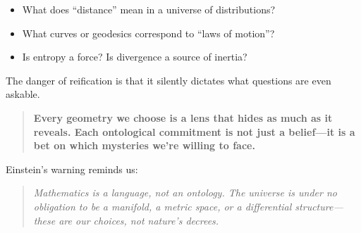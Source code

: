 \begin{tcolorbox}[colback=yellow!5!white, colframe=yellow!50!black, title={Historical Sidebar: Einstein’s Warning Against Reification}, breakable]
    \medskip
    
    \begin{itemize}
        \item What does “distance” mean in a universe of distributions?
        \item What curves or geodesics correspond to “laws of motion”?
        \item Is entropy a force? Is divergence a source of inertia?
    \end{itemize}

    \medskip
    
    The danger of reification is that it silently dictates what questions are even askable.
    
    \medskip
    
    \begin{quote}
    \textbf{Every geometry we choose is a lens that hides as much as it reveals.  Each ontological commitment is not just a belief—it is a bet on which mysteries we’re willing to face.}
    \end{quote}
    
    Einstein’s warning reminds us:
    
    \begin{quote}
    \textit{Mathematics is a language, not an ontology.  The universe is under no obligation to be a manifold, a metric space, or a differential structure—  these are our choices, not nature’s decrees.}
    \end{quote}
\end{tcolorbox}
